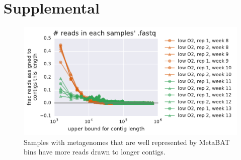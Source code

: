 \chapter{Supplemental}


\begin{figure}[H]
\centering
    \includegraphics[width=1.0\textwidth]{./tex/chapter2/figures/170124_bad_low_o2_samples_have_more_reads_on_short_contigs--binning_not_considered.pdf}
    \begin{singlespace}
    \caption[Samples best explained by bins have more reads drawn to longer contigs]{
        Samples with metagenomes that are well represented by MetaBAT bins have more reads drawn to longer contigs.}
    \label{fig:contig_dist}
    \end{singlespace}
\end{figure}

